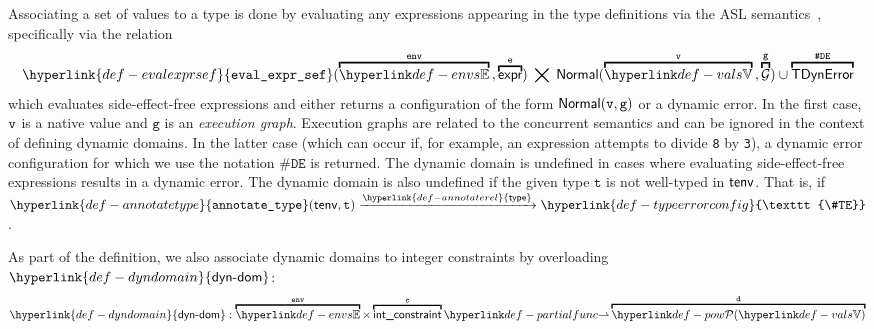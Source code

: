 \documentclass{book}
\newcommand\Normal[0]{\textsf{Normal}}
\newcommand\vg[0]{\texttt{g}}
\newcommand\env[0]{\texttt{env}}
\newcommand\evalexprsef[1]{\hyperlink{def-evalexprsef}{\texttt{eval\_expr\_sef}}(#1)}
\newcommand\XGraphs[0]{\mathcal{G}}
\newcommand\TError[0]{\textsf{TDynError}}
\newcommand\ErrorConfig[0]{\texttt{\#DE}}
\newcommand\dynamicdomain[0]{\hyperlink{def-dyndomain}{\textsf{dyn-dom}}}
\newcommand\TypeErrorConfig[0]{\hyperlink{def-typeerrorconfig}{\texttt{\#TE}}}
\newcommand\annotaterel[0]{\hyperlink{def-annotaterel}{\textsf{type}}}
\newcommand\typearrow[0]{\xrightarrow{\annotaterel}}
\newcommand\annotatetype[1]{\hyperlink{def-annotatetype}{\texttt{annotate\_type}}(#1)}
\newcommand\vc[0]{\texttt{c}}
\newcommand\vt[0]{\texttt{t}}
\begin{document}
Associating a set of values to a type is done by evaluating any expressions appearing
in the type definitions via the ASL semantics~\cite{ASLSemanticsReference},
specifically via the relation
\[
  \evalexprsef{\overname{\envs}{\env} \aslsep \overname{\expr}{\ve}} \;\aslrel\;
  \Normal(\overname{\vals}{\vv}\aslsep\overname{\XGraphs}{\vg}) \cup
  \overname{\TError}{\ErrorConfig}
\]
which evaluates side-effect-free expressions and either returns
a configuration of the form $\Normal(\vv,\vg)$ or a dynamic error.
In the first case, $\texttt{v}$ is a native value and $\vg$
is an \emph{execution graph}. Execution graphs are related to the concurrent semantics
and can be ignored in the context of defining dynamic domains.
In the latter case (which can occur if, for example, an expression attempts to divide
\texttt{8} by \texttt{3}), a dynamic error configuration for which we use the notation
$\ErrorConfig$ is returned.
%
The dynamic domain is undefined in cases where evaluating side-effect-free expressions
results in a dynamic error.
%
The dynamic domain is also undefined if the given type $\vt$ is not well-typed in $\textsf{tenv}$.
That is, if $\annotatetype{\tenv, \vt} \typearrow \TypeErrorConfig$.

As part of the definition, we also associate dynamic domains to integer constraints
by overloading $\dynamicdomain$:
\[
  \dynamicdomain : \overname{\envs}{\env} \times \overname{\intconstraint}{\vc}
  \partialto \overname{\pow{\vals}}{\vd}
\]
\end{document}
